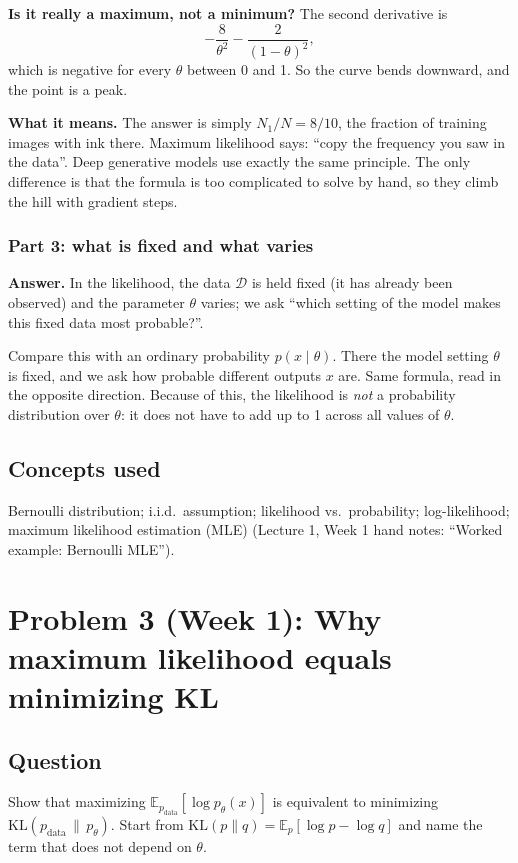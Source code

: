 \documentclass[12pt,a4paper]{article}
\begin{document}
\textbf{Is it really a maximum, not a minimum?} The second derivative is
\[
-\frac{8}{\theta^2} - \frac{2}{(1-\theta)^2},
\]
which is negative for every $\theta$ between 0 and 1. So the curve bends downward, and the point is a peak.

\textbf{What it means.} The answer is simply $N_1/N = 8/10$, the fraction of training images with ink there. Maximum likelihood says: ``copy the frequency you saw in the data''. Deep generative models use exactly the same principle. The only difference is that the formula is too complicated to solve by hand, so they climb the hill with gradient steps.

\subsubsection{Part 3: what is fixed and what varies}

\textbf{Answer.} In the likelihood, the data $\mathcal{D}$ is held fixed (it has already been observed) and the parameter $\theta$ varies; we ask ``which setting of the model makes this fixed data most probable?''.

Compare this with an ordinary probability $p(x \mid \theta)$. There the model setting $\theta$ is fixed, and we ask how probable different outputs $x$ are. Same formula, read in the opposite direction. Because of this, the likelihood is \emph{not} a probability distribution over $\theta$: it does not have to add up to 1 across all values of $\theta$.

\subsection{Concepts used}

Bernoulli distribution; i.i.d.\ assumption; likelihood vs.\ probability; log-likelihood; maximum likelihood estimation (MLE) (Lecture 1, Week 1 hand notes: ``Worked example: Bernoulli MLE'').

\section{Problem 3 (Week 1): Why maximum likelihood equals minimizing KL}

\subsection{Question}

Show that maximizing $\mathbb{E}_{p_{\text{data}}}[\log p_\theta(x)]$ is equivalent to minimizing $\mathrm{KL}(p_{\text{data}} \,\|\, p_\theta)$. Start from $\mathrm{KL}(p\|q) = \mathbb{E}_p[\log p - \log q]$ and name the term that does not depend on $\theta$.
\end{document}
